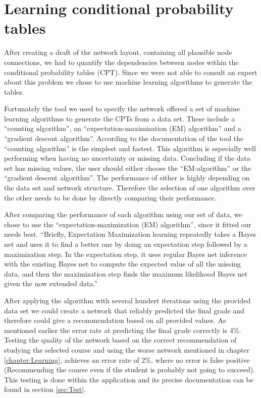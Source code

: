 \documentclass[%
	pdftex,
	oneside,        %
	11pt,           %
	parskip=half,   %
	headsepline,    %
	footsepline,    %
	abstracton,     %
	USenglish,      %
	a4paper,        %
]{report}
\begin{document}
\chapter{Learning conditional probability tables}
\label{chapter:Learning}
After creating a draft of the network layout, containing all plausible node connections, we had to quantify the dependencies between nodes within the conditional probability tables (CPT). Since we were not able to consult an expert about this problem we chose to use machine learning algorithms to generate the tables.

Fortunately the tool we used to specify the network offered a set of machine learning algorithms to generate the CPTs from a data set. These include a \enquote{counting algorithm}, an \enquote{expectation-maximization (EM) algorithm} and a \enquote{gradient descent algorithm}. According to the documentation of the tool the \enquote{counting algorithm} is the simplest and fastest. This algorithm is especially well performing when having no uncertainty or missing data. Concluding if the data set has missing values, the user should either choose the \enquote{EM-algorithm} or the \enquote{gradient descent algorithm}. The performance of either is highly depending on the data set and network structure. Therefore the selection of one algorithm over the other needs to be done by directly comparing their performance. \cite[p. 47]{Corp.:2010aa} 

After comparing the performance of each algorithm using our set of data, we chose to use the \enquote{expectation-maximization (EM) algorithm}, since it fitted our needs best. \enquote{Briefly, Expectation Maximization learning repeatedly takes a Bayes net and uses it to find a better one by doing an expectation step followed by a maximization step. In the expectation step, it uses regular Bayes net inference with the existing Bayes net to compute the expected value of all the missing data, and then the maximization step finds the maximum likelihood Bayes net given the now extended data.} \cite[p. 48]{Corp.:2010aa}

After applying the algorithm with several hundert iterations using the provided data set we could create a network that reliably predicted the final grade and therefore could give a recommendation based on all provided values. As mentioned earlier the error rate at predicting the final grade correctly is 4\%. Testing the quality of the network based on the correct recommendation of studying the selected course and using the worse network mentioned in chapter \vref{chapter:Learning}, achieves an error rate of 2\%, where no error is false positive (Recommending the course even if the student is probably not going to succeed). This testing is done within the application and its precise documentation can be found in section \vref{sec:Test}.
\end{document}
